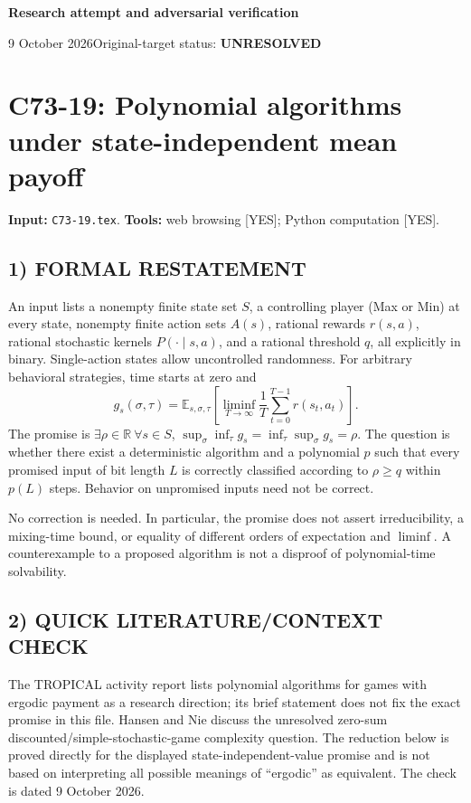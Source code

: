 \documentclass[11pt,a4paper]{article}
\theoremstyle{definition}
\theoremstyle{remark}
\begin{document}
{\large\bfseries Research attempt and adversarial verification}\par
9 October 2026\hfill Original-target status: \textbf{UNRESOLVED}\par
\section{C73-19: Polynomial algorithms under state-independent mean payoff}
\label{sec:C73-19}
\noindent\textbf{Input:} \texttt{C73-19.tex}. \quad\textbf{Tools:} web browsing [YES]; Python computation [YES].
\subsection*{1) FORMAL RESTATEMENT}
An input lists a nonempty finite state set $S$, a controlling player (Max or Min) at every state, nonempty finite action sets $A(s)$, rational rewards $r(s,a)$, rational stochastic kernels $P(\cdot\mid s,a)$, and a rational threshold $q$, all explicitly in binary. Single-action states allow uncontrolled randomness. For arbitrary behavioral strategies, time starts at zero and
\[
 g_s(\sigma,\tau)=\mathbb E_{s,\sigma,\tau}
 \left[\liminf_{T\to\infty}\frac1T\sum_{t=0}^{T-1}r(s_t,a_t)\right].
\]
The promise is $\exists\rho\in\mathbb R\ \forall s\in S$, $\sup_\sigma\inf_\tau g_s=\inf_\tau\sup_\sigma g_s=\rho$. The question is whether there exist a deterministic algorithm and a polynomial $p$ such that every promised input of bit length $L$ is correctly classified according to $\rho\geq q$ within $p(L)$ steps. Behavior on unpromised inputs need not be correct.

No correction is needed. In particular, the promise does not assert irreducibility, a mixing-time bound, or equality of different orders of expectation and $\liminf$. A counterexample to a proposed algorithm is not a disproof of polynomial-time solvability.

\subsection*{2) QUICK LITERATURE/CONTEXT CHECK}
The TROPICAL activity report \cite{tropical} lists polynomial algorithms for games with ergodic payment as a research direction; its brief statement does not fix the exact promise in this file. Hansen and Nie \cite{hansen-nie} discuss the unresolved zero-sum discounted/simple-stochastic-game complexity question. The reduction below is proved directly for the displayed state-independent-value promise and is not based on interpreting all possible meanings of ``ergodic'' as equivalent. The check is dated 9 October 2026.
\end{document}
